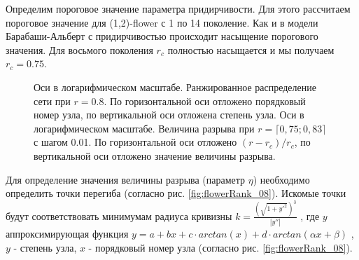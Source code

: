 \documentclass[10pt,aps,pra]{revtex4-1}
\begin{document}
        Определим пороговое значение параметра придирчивости. Для этого рассчитаем пороговое значение для (1,2)-flower с 1 по 14 поколение. Как и в модели Барабаши-Альберт с придирчивостью происходит насыщение порогового значения. Для восьмого поколения $r_c$ полностью насыщается и мы получаем $r_c=0.75$. 

            \begin{figure}[H]  
                \centering

                \caption{
                    \label{fig:flowerRank}
                     Оси в логарифмическом масштабе. Ранжированное распределение сети при $r=0.8$. По горизонтальной оси отложено порядковый номер узла, по вертикальной оси отложена степень узла.
                     Оси в логарифмическом масштабе. Величина разрыва при $r=\lceil 0,75; 0,83 \rceil$ с шагом 0.01. По горизонтальной оси отложено $(r-r_c)/r_c$, по вертикальной оси отложено значение величины разрыва.
                }
            \end{figure}

        Для определение значения величины разрыва (параметр $\eta$) необходимо определить точки перегиба (согласно рис. \ref{fig:flowerRank_08}). Искомые точки будут соответствовать минимумам радиуса кривизны $k=\frac{(\sqrt{1+y'^2})^3}{|y''|}$ \cite{Hazewinkel}, где $y$ аппроксимирующая функция $y=a+bx+c \cdot arctan(x) + d \cdot arctan(\alpha x + \beta)$ \cite{Mills}, $y$ - степень узла, $x$ - порядковый номер узла (согласно рис. \ref{fig:flowerRank_08}).
\end{document}
